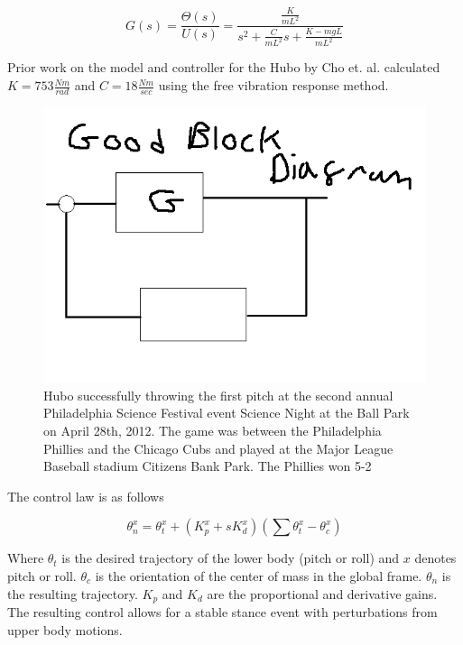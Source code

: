 \begin{equation}
G(s) = \frac{\Theta(s)}{U(s)} = \frac{\frac{K}{mL^2}}{s^2+\frac{C}{mL^2}s + \frac{K-mgL}{mL^2}}
\end{equation}

Prior work on the model and controller for the Hubo by Cho et. al. calculated $K=753\frac{Nm}{rad}$ and $C=18\frac{Nm}{sec}$ using the free vibration response method\cite{5379574}.


\begin{figure}[ht]
  \centering
\includegraphics[width=1.0\columnwidth]{./pix/blockDiagram.png}
  \caption{Hubo successfully throwing the first pitch at the second annual Philadelphia Science Festival event Science Night at the Ball Park on April 28th, 2012.  The game was between the Philadelphia Phillies and the Chicago Cubs and played at the Major League Baseball stadium Citizens Bank Park.  The Phillies won 5-2}
  \label{fig:ctrlBlockDiagram}
\end{figure}

The control law is as follows

\begin{equation}
\theta_{n}^x = \theta_{t}^x + (K_p^x+sK_d^x)(\sum \theta_{t}^x - \theta_{c}^x)
\end{equation}

Where $\theta_t$ is the desired trajectory of the lower body (pitch or roll) and $x$ denotes pitch or roll.  $\theta_{c}$ is the orientation of the center of mass in the global frame.  $\theta_n$ is the resulting trajectory.  $K_p$ and $K_d$ are the proportional and derivative gains.  The resulting control allows for a stable stance event with perturbations from upper body motions.
